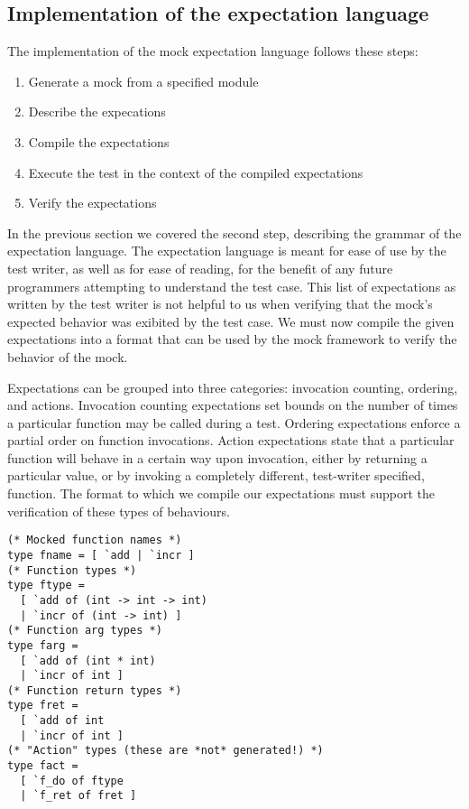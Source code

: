 \subsection{Implementation of the expectation language}
\label{application:mock_impl}


The implementation of the mock expectation language follows these
steps:

\begin{enumerate}
\item Generate a mock from a specified module
\item Describe the expecations
\item Compile the expectations
\item Execute the test in the context of the compiled expectations
\item Verify the expectations
\end{enumerate}

In the previous section we covered the second step, describing the
grammar of the expectation language. The expectation language is meant
for ease of use by the test writer, as well as for ease of reading,
for the benefit of any future programmers attempting to understand the
test case. This list of expectations as written by the test writer is
not helpful to us when verifying that the mock's expected behavior was
exibited by the test case. We must now compile the given expectations
into a format that can be used by the mock framework to verify the
behavior of the mock.

Expectations can be grouped into three categories: invocation
counting, ordering, and actions. Invocation counting expectations set
bounds on the number of times a particular function may be called
during a test. Ordering expectations enforce a partial order on
function invocations. Action expectations state that a particular
function will behave in a certain way upon invocation, either by
returning a particular value, or by invoking a completely different,
test-writer specified, function. The format to which we compile our
expectations must support the verification of these types of
behaviours.


\begin{lstlisting}[aboveskip=\baselineskip,
    caption=Example of types needed for a generated mock module,
    label=code:simple_mock_types]
(* Mocked function names *)
type fname = [ `add | `incr ]
(* Function types *)
type ftype =
  [ `add of (int -> int -> int)
  | `incr of (int -> int) ]
(* Function arg types *)
type farg =
  [ `add of (int * int)
  | `incr of int ]
(* Function return types *)
type fret =
  [ `add of int
  | `incr of int ]
(* "Action" types (these are *not* generated!) *)
type fact =
  [ `f_do of ftype
  | `f_ret of fret ]
\end{lstlisting}

